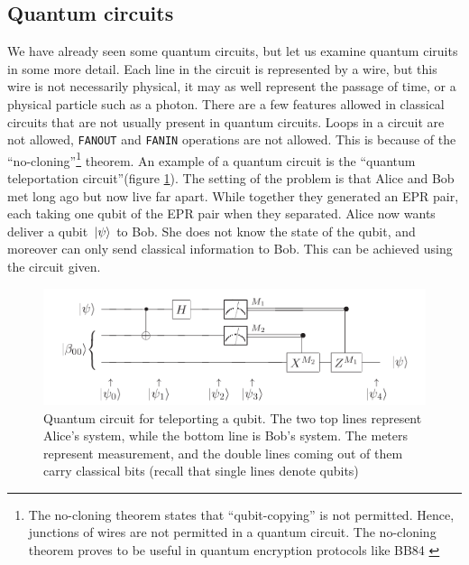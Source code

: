\documentclass[conference]{IEEEtran}
\begin{document}
\subsection{Quantum circuits}
We have already seen some quantum circuits, but let us examine quantum ciruits in some more detail. Each line in the circuit is represented by a wire, but this wire is not necessarily physical, 
it may as well represent the passage of time, or a physical particle such as a photon. There are a few features allowed in classical circuits that are not usually present in
quantum circuits. Loops in a circuit are not allowed, \verb|FANOUT| and \verb|FANIN| operations are not allowed. This is because of the ``no-cloning''\footnote{The no-cloning theorem states that ``qubit-copying'' is not permitted. Hence, junctions of wires are not permitted in a quantum circuit. The no-cloning theorem proves to be useful in quantum encryption protocols like BB84 \cite{b4}} theorem.
An example of a quantum circuit is the ``quantum teleportation circuit''(figure \ref{teleport}). The setting of the problem is that Alice and Bob met long ago but now live
far apart. While together they generated an EPR pair, each taking one qubit of the EPR pair when they separated. Alice now wants deliver a qubit $\ket*{\psi}$ to Bob. She does not know the state of
the qubit, and moreover can only send classical information to Bob. This can be achieved using the circuit given. 

\begin{figure}[htbp]
\centerline{\includegraphics[scale = 0.5]{Images/teleport.png}}
\caption{Quantum circuit for teleporting a qubit. The two top lines represent Alice's system, while the bottom
line is Bob's system. The meters represent measurement, and the double lines coming out of them carry classical
bits (recall that single lines denote qubits)}
\label{teleport}
\end{figure}
\end{document}
